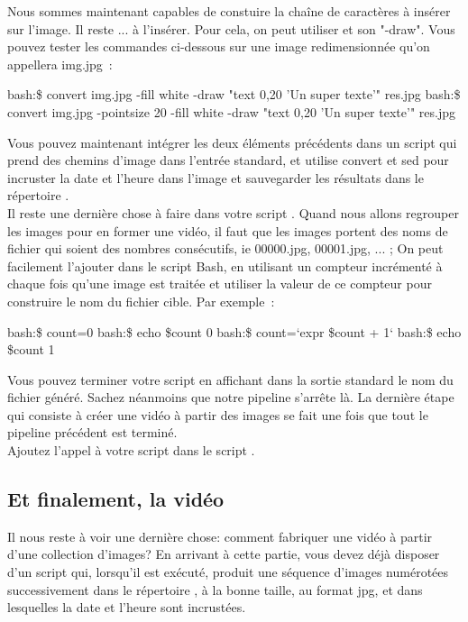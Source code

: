 Nous sommes maintenant capables de constuire la chaîne de caractères à insérer sur l'image. Il reste ... à l'insérer. Pour cela, on peut utiliser \convert et son "-draw". Vous pouvez tester les commandes ci-dessous sur une image redimensionnée qu'on appellera img.jpg~:
\begin{exempleResultat}
bash:\$ convert img.jpg -fill white -draw "text 0,20 'Un super texte'" res.jpg 
bash:\$ convert img.jpg -pointsize 20 -fill white -draw "text 0,20 'Un super texte'" res.jpg 
\end{exempleResultat}

Vous pouvez maintenant intégrer les deux éléments précédents dans un script  qui prend des chemins d'image dans l'entrée standard, et utilise convert et sed pour incruster la date et l'heure dans l'image et sauvegarder les résultats dans le répertoire .\\

Il reste une dernière chose à faire dans votre script . Quand nous allons regrouper les images pour en former une vidéo, il faut que les images portent des noms de fichier qui soient des nombres consécutifs, ie 00000.jpg, 00001.jpg, ... ; On peut facilement l'ajouter dans le script Bash, en utilisant un compteur incrémenté à chaque fois qu'une image est traitée et utiliser la valeur de ce compteur pour construire le nom du fichier cible. Par exemple~:
\begin{exempleResultat}
bash:\$ count=0
bash:\$ echo {\$}count
0
bash:\$ count=`expr {\$}count + 1`
bash:\$ echo {\$}count
1
\end{exempleResultat}
Vous pouvez terminer votre script en affichant dans la sortie standard le nom du fichier généré. Sachez néanmoins que notre pipeline s'arrête là. La dernière étape qui consiste à créer une vidéo à partir des images se fait une fois que tout le pipeline précédent est terminé.\\

Ajoutez l'appel à votre script  dans le script .

\subsection{Et finalement, la vidéo}

Il nous reste à voir une dernière chose: comment fabriquer une vidéo à partir d'une collection d'images? En arrivant à cette partie, vous devez déjà disposer d'un script  qui, lorsqu'il est exécuté, produit une séquence d'images numérotées successivement dans le répertoire , à la bonne taille, au format jpg, et dans lesquelles la date et l'heure sont incrustées.\\

